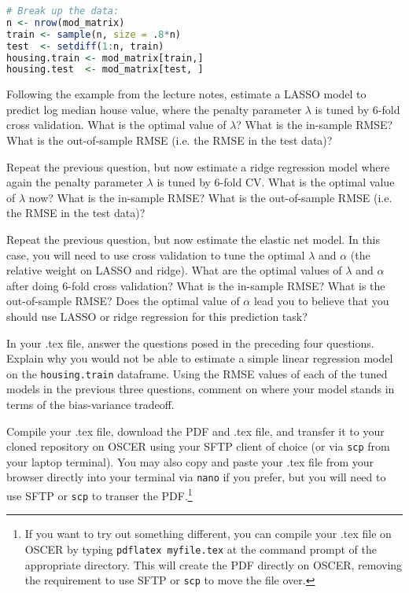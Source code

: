 \documentclass[12pt,english]{exam}
\begin{document}
\begin{questions}
\begin{lstlisting}[language=R]
# Break up the data:
n <- nrow(mod_matrix)
train <- sample(n, size = .8*n)
test  <- setdiff(1:n, train)
housing.train <- mod_matrix[train,]
housing.test  <- mod_matrix[test, ]
\end{lstlisting}

\question Following the example from the lecture notes, estimate a LASSO model to predict log median house value, where the penalty parameter $\lambda$ is tuned by 6-fold cross validation. What is the optimal value of $\lambda$? What is the in-sample RMSE? What is the out-of-sample RMSE (i.e. the RMSE in the test data)?

\question Repeat the previous question, but now estimate a ridge regression model where again the penalty parameter $\lambda$ is tuned by 6-fold CV. What is the optimal value of $\lambda$ now? What is the in-sample RMSE? What is the out-of-sample RMSE (i.e. the RMSE in the test data)? 

\question Repeat the previous question, but now estimate the elastic net model. In this case, you will need to use cross validation to tune the optimal $\lambda$ and $\alpha$ (the relative weight on LASSO and ridge). What are the optimal values of $\lambda$ and $\alpha$ after doing 6-fold cross validation? What is the in-sample RMSE? What is the out-of-sample RMSE? Does the optimal value of $\alpha$ lead you to believe that you should use LASSO or ridge regression for this prediction task?

\question In your .tex file, answer the questions posed in the preceding four questions. Explain why you would not be able to estimate a simple linear regression model on the \texttt{housing.train} dataframe. Using the RMSE values of each of the tuned models in the previous three questions, comment on where your model stands in terms of the bias-variance tradeoff.

\question Compile your .tex file, download the PDF and .tex file, and transfer it to your cloned repository on OSCER using your SFTP client of choice (or via \texttt{scp} from your laptop terminal). You may also copy and paste your .tex file from your browser directly into your terminal via \texttt{nano} if you prefer, but you will need to use SFTP or \texttt{scp} to transer the PDF.\footnote{If you want to try out something different, you can compile your .tex file on OSCER by typing \texttt{pdflatex myfile.tex} at the command prompt of the appropriate directory. This will create the PDF directly on OSCER, removing the requirement to use SFTP or \texttt{scp} to move the file over.}


\end{questions}
\end{document}
